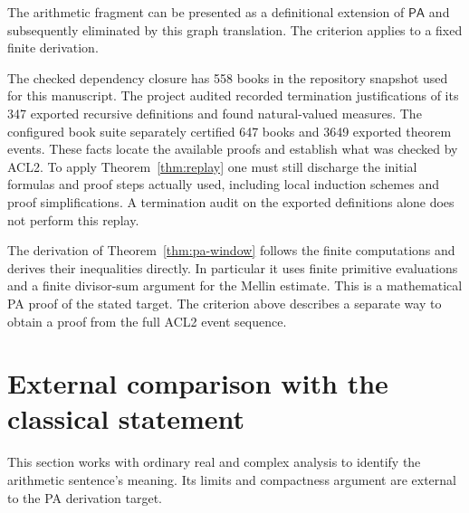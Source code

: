 \documentclass[11pt]{amsart}
\theoremstyle{definition}
\theoremstyle{remark}
\numberwithin{equation}{section}
\newcommand{\PA}{\mathsf{PA}}
\begin{document}
The arithmetic fragment can be presented as a definitional
extension of $\PA$ and subsequently eliminated by this graph
translation. The criterion applies to a fixed finite derivation.

The checked dependency closure has 558 books in the repository
snapshot used for this manuscript. The project audited recorded
termination justifications of its 347 exported recursive
definitions and found natural-valued measures. The configured
book suite separately certified 647 books and 3649 exported theorem
events. These facts locate the available proofs and establish
what was checked by ACL2. To apply Theorem~\ref{thm:replay} one must
still discharge the initial formulas and proof steps actually used,
including local induction schemes and proof simplifications. A
termination audit on the exported definitions alone does not perform
this replay.

The derivation of Theorem~\ref{thm:pa-window} follows
the finite computations and derives their inequalities directly.
In particular it uses finite primitive evaluations and a finite
divisor-sum argument for the Mellin estimate. This is a
mathematical PA proof of the stated target. The criterion above
describes a separate way to obtain a proof from the full ACL2
event sequence.

\section{External comparison with the classical statement}
\label{sec:comparison}

This section works with ordinary real and complex analysis to identify
the arithmetic sentence's meaning. Its limits and compactness argument
are external to the PA derivation target.
\end{document}
